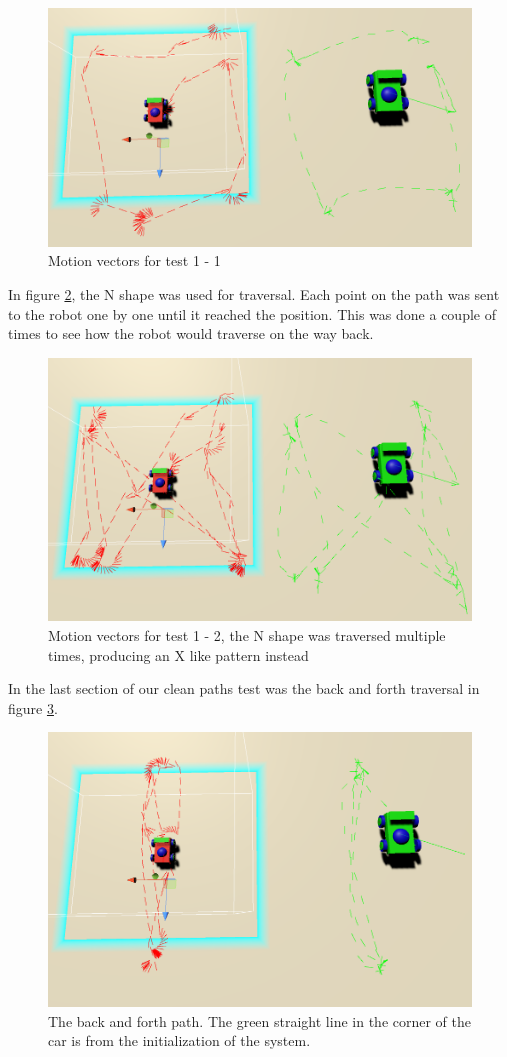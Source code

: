 \documentclass[10pt,a4paper]{article}
\begin{document}
		\begin{figure}
			\centering
			\includegraphics[width=.6\textwidth]{car_motion_vector_T1_1.png}
			\caption{Motion vectors for test 1 - 1}
			\label{fig:vis_comp_t1_1}
		\end{figure}
	In figure \ref{fig:vis_comp_t1_2}, the N shape was used for traversal. Each point on the path was sent to the robot one by one until it reached the position. This was done a couple of times to see how the robot would traverse on the way back.
		\begin{figure}
			\centering
			\includegraphics[width=.6\textwidth]{car_motion_vector_T1_2.png}
			\caption{Motion vectors for test 1 - 2, the N shape was traversed multiple times, producing an X like pattern instead}
			\label{fig:vis_comp_t1_2}
		\end{figure}
	In the last section of our clean paths test was the back and forth traversal in figure \ref{fig:vis_comp_t1_3}.
		\begin{figure}
			\centering
			\includegraphics[width=.6\textwidth]{car_motion_vector_T1_3.png}
			\caption{The back and forth path. The green straight line in the corner of the car is from the initialization of the system.}
			\label{fig:vis_comp_t1_3}
		\end{figure}
\end{document}

